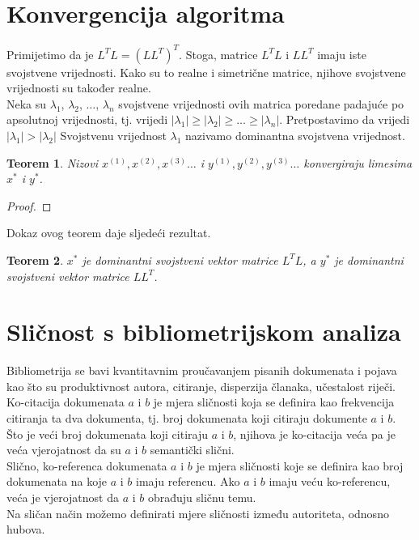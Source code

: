 \documentclass[11pt]{article}
\newtheorem{theorem}{Teorem}[section]
\begin{document}
\section{Konvergencija algoritma}
Primijetimo da je $L^{T}L = (LL^{T})^{T}$. Stoga, matrice $L^{T}L$ i $LL^{T}$ imaju iste svojstvene vrijednosti. Kako su to realne i simetrične matrice, njihove svojstvene vrijednosti su također realne.\\
Neka su $\lambda_{1}$, $\lambda_{2}$, $\dots$, $\lambda_{n}$ svojstvene vrijednosti ovih matrica poredane padajuće po apsolutnoj vrijednosti, tj. vrijedi $|\lambda_{1}|\geq |\lambda_{2}|\geq \dots \geq |\lambda_{n}|$. Pretpostavimo da vrijedi $|\lambda_{1}| > |\lambda_{2}|$
Svojstvenu vrijednost $\lambda_{1}$ nazivamo dominantna svojstvena vrijednost.

\begin{theorem}
Nizovi $x^{(1)}, x^{(2)}, x^{(3)}\dots$ i $y^{(1)}, y^{(2)}, y^{(3)}\dots$ konvergiraju limesima $x^{*}$ i $y^{*}$.
\end{theorem}
\begin{proof}

\end{proof}

Dokaz ovog teorem daje sljedeći rezultat.
\begin{theorem}
$x^{*}$ je dominantni svojstveni vektor matrice $L^{T}L$, a $y^{*}$ je dominantni svojstveni vektor matrice $LL^{T}$.
\end{theorem}

\section{Sličnost s bibliometrijskom analiza}
Bibliometrija se bavi kvantitavnim proučavanjem pisanih dokumenata i pojava kao što su produktivnost autora, citiranje, disperzija članaka, učestalost riječi. \\
Ko-citacija dokumenata $a$ i $b$ je mjera sličnosti koja se definira kao frekvencija citiranja ta dva dokumenta, tj. broj dokumenata koji citiraju dokumente $a$ i $b$. Što je veći broj dokumenata koji citiraju $a$ i $b$, njihova je ko-citacija veća pa je veća vjerojatnost da su $a$ i $b$ semantički slični.\\
Slično, ko-referenca dokumenata $a$ i $b$ je mjera sličnosti koje se definira kao broj dokumenata na koje $a$ i $b$ imaju referencu. Ako $a$ i $b$ imaju veću ko-referencu, veća je vjerojatnost da $a$ i $b$ obrađuju sličnu temu.\\
Na sličan način možemo definirati mjere sličnosti između autoriteta, odnosno hubova.
\end{document}
